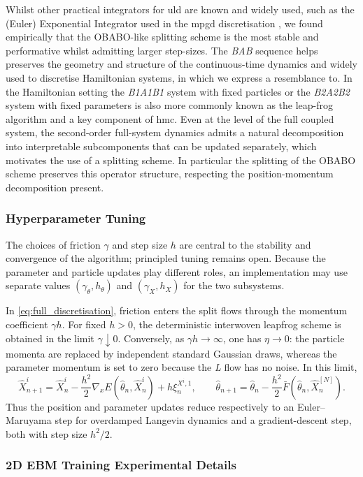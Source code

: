 Whilst other practical integrators for \gls*{uld} are known and widely used, such as the (Euler) Exponential Integrator used in the \gls*{mpgd} discretisation \citep{lim2024momentumparticlemaximumlikelihood}, we found empirically that the OBABO-like splitting scheme is the most stable and performative whilst admitting larger step-sizes. The \textit{BAB} sequence helps preserves the geometry and structure of the continuous-time dynamics and widely used to discretise Hamiltonian systems, in which we express a resemblance to. In the Hamiltonian setting the \textit{B1A1B1} system with fixed particles or the \textit{B2A2B2} system with fixed parameters is also more commonly known as the leap-frog algorithm and a key component of \gls*{hmc}. Even at the level of the full coupled system, the second-order full-system dynamics admits a natural decomposition into interpretable subcomponents that can be updated separately, which motivates the use of a splitting scheme. In particular the splitting of the OBABO scheme preserves this operator structure, respecting the position-momentum decomposition present.

\subsubsection{Hyperparameter Tuning}  \label{sec:algorithm_hp_tuning}
The choices of friction \(\gamma\) and step size \(h\) are central to the stability and convergence of the algorithm; principled tuning remains open. Because the parameter and particle updates play different roles, an implementation may use separate values \((\gamma_\theta,h_\theta)\) and \((\gamma_X,h_X)\) for the two subsystems.

In \eqref{eq:full_discretisation}, friction enters the split flows through the momentum coefficient \(\gamma h\). For fixed \(h>0\), the deterministic interwoven leapfrog scheme is obtained in the limit \(\gamma\downarrow0\). Conversely, as \(\gamma h\to\infty\), one has \(\eta\to0\): the particle momenta are replaced by independent standard Gaussian draws, whereas the parameter momentum is set to zero because the \textit{L} flow has no noise. In this limit,
\[
\widehat X_{n+1}^i
=
\widehat X_n^i-\frac{h^2}{2}\nabla_xE(\widehat\theta_n,\widehat X_n^i)
+h\xi_n^{X^i,1},
\qquad
\widehat\theta_{n+1}
=
\widehat\theta_n-\frac{h^2}{2}\bar F(\widehat\theta_n,\widehat X_n^{[N]}).
\]
Thus the position and parameter updates reduce respectively to an Euler--Maruyama step for overdamped Langevin dynamics and a gradient-descent step, both with step size \(h^2/2\).

\subsubsection{2D \textsc{\small EBM} Training Experimental Details}\label{app:training_ebm_2d}
